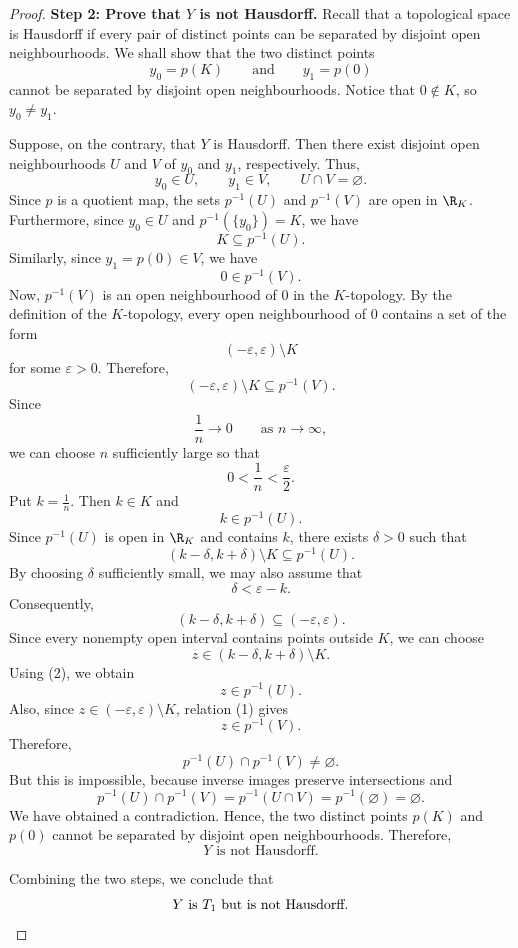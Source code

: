 \begin{proof}
\textbf{Step 2: Prove that $Y$ is not Hausdorff.}
Recall that a topological space is Hausdorff if every pair of distinct points can be
separated by disjoint open neighbourhoods. We shall show that the two distinct points
\[ y_0=p(K)\qquad\text{and}\qquad y_1=p(0) \]
cannot be separated by disjoint open neighbourhoods. Notice that $0\notin K$, so
$y_0\neq y_1$.

Suppose, on the contrary, that $Y$ is Hausdorff. Then there exist disjoint open
neighbourhoods $U$ and $V$ of $y_0$ and $y_1$, respectively. Thus,
\[ y_0\in U,\qquad y_1\in V,\qquad U\cap V=\varnothing. \]
Since $p$ is a quotient map, the sets $p^{-1}(U)$ and $p^{-1}(V)$ are open in $\R_K$.
Furthermore, since $y_0\in U$ and $p^{-1}(\{y_0\})=K$, we have
\[ K\subseteq p^{-1}(U). \]
Similarly, since $y_1=p(0)\in V$, we have
\[ 0\in p^{-1}(V). \]
Now, $p^{-1}(V)$ is an open neighbourhood of $0$ in the $K$-topology. By the definition of
the $K$-topology, every open neighbourhood of $0$ contains a set of the form
\[ (-\varepsilon,\varepsilon)\setminus K \]
for some $\varepsilon>0$. Therefore,
\begin{equation*}
(-\varepsilon,\varepsilon)\setminus K\subseteq p^{-1}(V). \tag{1}
\end{equation*}
Since
\[ \frac1n\longrightarrow 0\qquad\text{as } n\longrightarrow\infty, \]
we can choose $n$ sufficiently large so that
\[ 0<\frac1n<\frac{\varepsilon}{2}. \]
Put $k=\frac1n$. Then $k\in K$ and
\[ k\in p^{-1}(U). \]
Since $p^{-1}(U)$ is open in $\R_K$ and contains $k$, there exists $\delta>0$ such that
\begin{equation*}
(k-\delta,k+\delta)\setminus K\subseteq p^{-1}(U). \tag{2}
\end{equation*}
By choosing $\delta$ sufficiently small, we may also assume that
\[ \delta<\varepsilon-k. \]
Consequently,
\[ (k-\delta,k+\delta)\subseteq(-\varepsilon,\varepsilon). \]
Since every nonempty open interval contains points outside $K$, we can choose
\[ z\in(k-\delta,k+\delta)\setminus K. \]
Using (2), we obtain
\[ z\in p^{-1}(U). \]
Also, since $z\in(-\varepsilon,\varepsilon)\setminus K$, relation (1) gives
\[ z\in p^{-1}(V). \]
Therefore,
\[ p^{-1}(U)\cap p^{-1}(V)\neq\varnothing. \]
But this is impossible, because inverse images preserve intersections and
\[ p^{-1}(U)\cap p^{-1}(V)=p^{-1}(U\cap V)=p^{-1}(\varnothing)=\varnothing. \]
We have obtained a contradiction. Hence, the two distinct points $p(K)$ and $p(0)$ cannot be
separated by disjoint open neighbourhoods. Therefore,
\[ Y \text{ is not Hausdorff.} \]

Combining the two steps, we conclude that
\[ Y \text{ is } T_1 \text{ but is not Hausdorff.} \qedhere \]
\end{proof}

